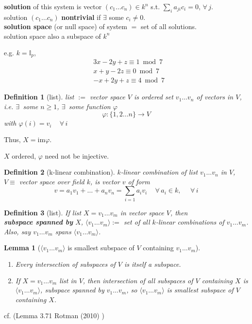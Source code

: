 \documentclass[10pt]{amsart}
\newtheorem{lemma}{Lemma}
\newtheorem{definition}{Definition}
\begin{document}
\begin{multicols*}{2}
\begin{enumerate}
	\textbf{solution} of this system is vector $(c_1 \dots c_n) \in k^n$ s.t. $\sum_i a_{ji} c_i  =0$, $\forall \, j$. \\
	solution $(c_1 \dots c_n)$ \textbf{nontrivial} if $\exists$ some $c_i \neq 0$. \\
	\textbf{solution space} (or null space) of system $=$ set of all solutions. \\
	solution space also a subspace of $k^n$
\end{enumerate}

e.g. $k = \mathbb{I}_p$, 
\[
\begin{aligned}
& 3x - 2y + z \equiv 1 \bmod{7} \\
& x + y -2 z \equiv 0 \bmod{7} \\
& -x + 2y + z \equiv 4 \bmod{7}
\end{aligned}
\]
\begin{definition}[list]
	list $:=$ vector space $V$ is ordered set $v_1 \dots v_n$ of vectors in $V$, i.e. 
	$\exists \, $ some $n\geq 1$, $\exists \, $ some function $\varphi$ 
	\[
	\varphi : \lbrace 1,2\dots n \rbrace \to V
	\]
	with $\varphi(i) = v_i \quad \, \forall \, i$
\end{definition}

Thus, $X = \text{im}\varphi$.

$X$ ordered, $\varphi$ need not be injective. 

\begin{definition}[k-linear combination]
	$k$-linear combination of list $v_1\dots v_n$ in $V$, $V\equiv $ vector space over field $k$, is vector $v$ of form 
	\[
	v = a_1 v_1 + \dots + a_n v_n  = \sum_{i=1} a_i v_i \quad \, \forall \, a_i \in k, \, \quad \, \forall \, i
	\]
\end{definition}

\begin{definition}[list]
	If list $X = v_1 \dots v_m$ in vector space $V$, then \\
	\textbf{subspace spanned by } $X$, $\langle v_1 \dots v_m \rangle := $ set of all $k$-linear combinations of $v_1 \dots v_m$.  Also, say $v_1 \dots v_m $ spans $\langle v_1 \dots v_m\rangle$. 
\end{definition}

\begin{lemma}[$\langle v_1 \dots v_m \rangle$ is smallest subspace of $V$ containing $v_1\dots v_m$]\label{Lemma:smallest_subspace}
\begin{enumerate}
	\item[(i)] Every intersection of subspaces of $V$ is itself a subspace.
	\item[(ii)] If $X= v_1 \dots v_m$ list in $V$, then intersection of all subspaces of $V$ containing $X$ is $\langle v_1 \dots v_m \rangle$, subspace spanned by $v_1\dots v_m$, so $\langle v_1 \dots v_m \rangle$ is smallest subspace of $V$ containing $X$. 
\end{enumerate}
\end{lemma}
cf. (Lemma 3.71 Rotman (2010) \cite{JRotman2010}) 


\end{multicols*}
\end{document}
